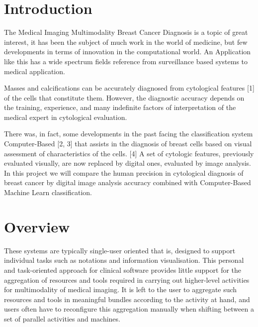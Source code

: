 \begin{titlepage}

\vfill %

\end{titlepage}

\section{Introduction}

The Medical Imaging Multimodality Breast Cancer Diagnosis is a topic of great interest, it has been the subject of much work in the world of medicine, but few developments in terms of innovation in the computational world. An Application like this has a wide spectrum fields reference from surveillance based systems to medical application.

Masses and calcifications can be accurately diagnosed from cytological features [1] of the cells that constitute them. However, the diagnostic accuracy depends on the training, experience, and many indefinite factors of interpretation of the medical expert in cytological evaluation.

There was, in fact, some developments in the past facing the classification system Computer-Based [2, 3] that assists in the diagnosis of breast cells based on visual assessment of characteristics of the cells. [4] A set of cytologic features, previously evaluated visually, are now replaced by digital ones, evaluated by image analysis. In this project we will compare the human precision in cytological diagnosis of breast cancer by digital image analysis accuracy combined with Computer-Based Machine Learn classification.

\section{Overview}

These systems are typically single-user oriented that is, designed to support individual tasks such as notations and information visualisation. This personal and task-oriented approach for clinical software provides little support for the aggregation of resources and tools required in carrying out higher-level activities for multimodality of medical imaging. It is left to the user to aggregate such resources and tools in meaningful bundles according to the activity at hand, and users often have to reconfigure this aggregation manually when shifting between a set of parallel activities and machines.

